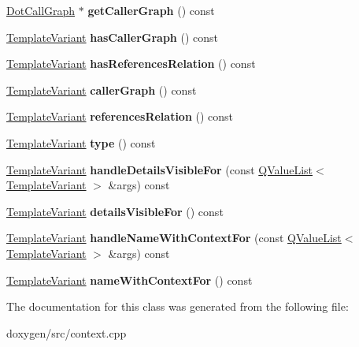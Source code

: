 \begin{DoxyCompactItemize}
\mbox{\hyperlink{class_dot_call_graph}{Dot\+Call\+Graph}} $\ast$ {\bfseries get\+Caller\+Graph} () const
\item 
\mbox{\label{class_member_context_1_1_private_a5f0fa3d551136a7409506330374a2862}} 
\mbox{\hyperlink{class_template_variant}{Template\+Variant}} {\bfseries has\+Caller\+Graph} () const
\item 
\mbox{\label{class_member_context_1_1_private_ad38d1168cc9faa1c7f35ba542f7c5056}} 
\mbox{\hyperlink{class_template_variant}{Template\+Variant}} {\bfseries has\+References\+Relation} () const
\item 
\mbox{\label{class_member_context_1_1_private_a7ff50ffaa9c378f7d8300539670a67a3}} 
\mbox{\hyperlink{class_template_variant}{Template\+Variant}} {\bfseries caller\+Graph} () const
\item 
\mbox{\label{class_member_context_1_1_private_a4aedd078da9ee5577d0e5365a3df4536}} 
\mbox{\hyperlink{class_template_variant}{Template\+Variant}} {\bfseries references\+Relation} () const
\item 
\mbox{\label{class_member_context_1_1_private_af43ca0bca04349abd3d54bc240ec3b51}} 
\mbox{\hyperlink{class_template_variant}{Template\+Variant}} {\bfseries type} () const
\item 
\mbox{\label{class_member_context_1_1_private_acd2eb9d7d5239c873307fa44ecf6b522}} 
\mbox{\hyperlink{class_template_variant}{Template\+Variant}} {\bfseries handle\+Details\+Visible\+For} (const \mbox{\hyperlink{class_q_value_list}{Q\+Value\+List}}$<$ \mbox{\hyperlink{class_template_variant}{Template\+Variant}} $>$ \&args) const
\item 
\mbox{\label{class_member_context_1_1_private_a23a386279707f8e5982860fcfeeb179f}} 
\mbox{\hyperlink{class_template_variant}{Template\+Variant}} {\bfseries details\+Visible\+For} () const
\item 
\mbox{\label{class_member_context_1_1_private_ad5f1d5f77aed36ec4cac0fc17c58cccb}} 
\mbox{\hyperlink{class_template_variant}{Template\+Variant}} {\bfseries handle\+Name\+With\+Context\+For} (const \mbox{\hyperlink{class_q_value_list}{Q\+Value\+List}}$<$ \mbox{\hyperlink{class_template_variant}{Template\+Variant}} $>$ \&args) const
\item 
\mbox{\label{class_member_context_1_1_private_a260fd3e94b98453f7384dab0876e519d}} 
\mbox{\hyperlink{class_template_variant}{Template\+Variant}} {\bfseries name\+With\+Context\+For} () const
\end{DoxyCompactItemize}


The documentation for this class was generated from the following file\+:\begin{DoxyCompactItemize}
\item 
doxygen/src/context.\+cpp\end{DoxyCompactItemize}
